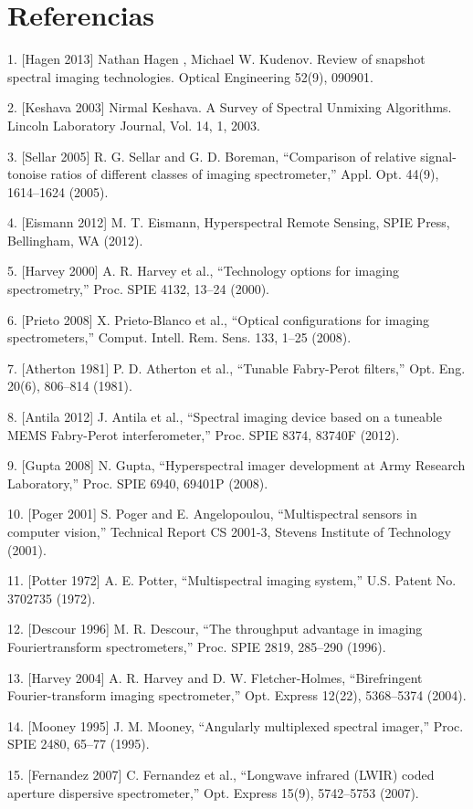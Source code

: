 \documentclass{ctuthesis}
\begin{document}
\section*{Referencias}
1. [Hagen 2013] Nathan Hagen , Michael W. Kudenov. Review of snapshot spectral imaging technologies. Optical Engineering 52(9), 090901.

2. [Keshava 2003] Nirmal Keshava. A Survey of Spectral Unmixing Algorithms. Lincoln Laboratory Journal, Vol. 14, 1, 2003.

3. [Sellar 2005] R. G. Sellar and G. D. Boreman, “Comparison of relative signal-tonoise
ratios of different classes of imaging spectrometer,” Appl. Opt. 44(9), 1614–1624 (2005).

4. [Eismann 2012] M. T. Eismann, Hyperspectral Remote Sensing, SPIE Press, Bellingham, WA (2012).

5. [Harvey 2000] A. R. Harvey et al., “Technology options for imaging spectrometry,”
Proc. SPIE 4132, 13–24 (2000).

6. [Prieto 2008] X. Prieto-Blanco et al., “Optical configurations for imaging spectrometers,” Comput. Intell. Rem. Sens. 133, 1–25 (2008).

7. [Atherton 1981] P. D. Atherton et al., “Tunable Fabry-Perot filters,” Opt. Eng. 20(6),
806–814 (1981).

8. [Antila 2012] J. Antila et al., “Spectral imaging device based on a tuneable MEMS
Fabry-Perot interferometer,” Proc. SPIE 8374, 83740F (2012).

9. [Gupta 2008] N. Gupta, “Hyperspectral imager development at Army Research
Laboratory,” Proc. SPIE 6940, 69401P (2008).

10. [Poger 2001] S. Poger and E. Angelopoulou, “Multispectral sensors in computer
vision,” Technical Report CS 2001-3, Stevens Institute of Technology (2001).

11. [Potter 1972] A. E. Potter, “Multispectral imaging system,” U.S. Patent No. 3702735 (1972).

12. [Descour 1996] M. R. Descour, “The throughput advantage in imaging Fouriertransform spectrometers,” Proc. SPIE 2819, 285–290 (1996).

13. [Harvey 2004] A. R. Harvey and D. W. Fletcher-Holmes, “Birefringent Fourier-transform imaging spectrometer,” Opt. Express 12(22), 5368–5374 (2004).

14. [Mooney 1995] J. M. Mooney, “Angularly multiplexed spectral imager,” Proc. SPIE
2480, 65–77 (1995).

15. [Fernandez 2007] C. Fernandez et al., “Longwave infrared (LWIR) coded aperture
dispersive spectrometer,” Opt. Express 15(9), 5742–5753 (2007).
\end{document}
